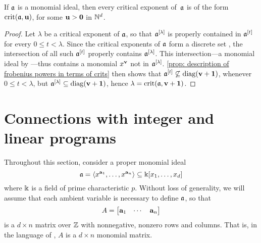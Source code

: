 \documentclass[11pt]{amsart}
\begin{document}
\begin{corollary}
   \label{cor: every crit is crit wrt diagonal ideal}
   If $\mathfrak{a}$ is a monomial ideal, then every critical exponent of~$\mathfrak{a}$ is of the form $\operatorname{crit}(\mathfrak{a},\mathbf{u})$, for some $\mathbf{u} > \mathbf{0}$ in $\mathbb{N}^d$.
\end{corollary}

\begin{proof}
   Let $\lambda$ be a critical exponent of $\mathfrak{a}$, so that $\mathfrak{a}^{[\lambda]}$ is properly contained in $\mathfrak{a}^{[t]}$ for every $0 \le t <\lambda$.
   Since the critical exponents of $\mathfrak{a}$ form a discrete set \cite[Corollary~5.8]{hernandez+etal.frobenius_powers}, the intersection of all such $\mathfrak{a}^{[t]}$ properly contains $\mathfrak{a}^{[\lambda]}$.
   This intersection---a monomial ideal by ---thus contains a monomial $x^{\mathbf{v}}$ not in $\mathfrak{a}^{[\lambda]}$.
   \cref{prop: description of frobenius powers in terms of crits} then shows that $\mathfrak{a}^{[t]}\not\subseteq \operatorname{diag}(\mathbf{v}+\mathbf{1})$, whenever $0\le t < \lambda$, but $\mathfrak{a}^{[\lambda]} \subseteq \operatorname{diag}(\mathbf{v}+\mathbf{1})$, hence $\lambda = \operatorname{crit}(\mathfrak{a},\mathbf{v}+\mathbf{1})$.
\end{proof}



\newpage
\section{Connections with integer and linear programs}
\label{sec: LPs}

Throughout this section, consider a proper monomial ideal
\[ \mathfrak{a} = \langle x^{\mathbf{a}_1}, \ldots, x^{\mathbf{a}_n} \rangle \subseteq \Bbbk[x_1, \ldots, x_d] \]
where $\Bbbk$ is a field of prime characteristic $p$.  Without loss of generality, we will assume that each ambient variable is necessary to define $\mathfrak{a}$, so that \[ A = \begin{bmatrix} \mathbf{a}_1 & \cdots & \mathbf{a}_n \end{bmatrix} \] is a $d \times n$ matrix over $\mathbb{Z}$ with nonnegative, nonzero rows and columns.  That is, in the language of , $A$ is a $d \times n$ monomial matrix.   
\end{document}
